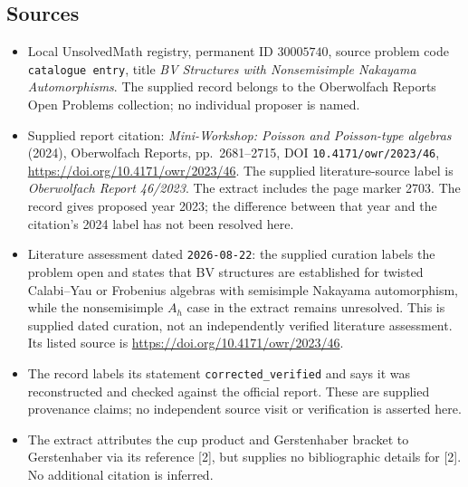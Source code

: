 \documentclass[11pt]{article}
\begin{document}
\subsection{Sources}
\begin{itemize}
\item Local UnsolvedMath registry, permanent ID \(30005740\), source problem code \texttt{catalogue entry}, title \emph{BV Structures with Nonsemisimple Nakayama Automorphisms}. The supplied record belongs to the Oberwolfach Reports Open Problems collection; no individual proposer is named.
\item Supplied report citation: \emph{Mini-Workshop: Poisson and Poisson-type algebras} (2024), Oberwolfach Reports, pp.~2681--2715, DOI \texttt{10.4171/owr/2023/46}, \url{https://doi.org/10.4171/owr/2023/46}. The supplied literature-source label is \emph{Oberwolfach Report 46/2023}. The extract includes the page marker 2703. The record gives proposed year 2023; the difference between that year and the citation's 2024 label has not been resolved here.
\item Literature assessment dated \texttt{2026-08-22}: the supplied curation labels the problem open and states that BV structures are established for twisted Calabi--Yau or Frobenius algebras with semisimple Nakayama automorphism, while the nonsemisimple \(A_h\) case in the extract remains unresolved. This is supplied dated curation, not an independently verified literature assessment. Its listed source is \url{https://doi.org/10.4171/owr/2023/46}.
\item The record labels its statement \texttt{corrected\_verified} and says it was reconstructed and checked against the official report. These are supplied provenance claims; no independent source visit or verification is asserted here.
\item The extract attributes the cup product and Gerstenhaber bracket to Gerstenhaber via its reference [2], but supplies no bibliographic details for [2]. No additional citation is inferred.
\end{itemize}
\end{document}
